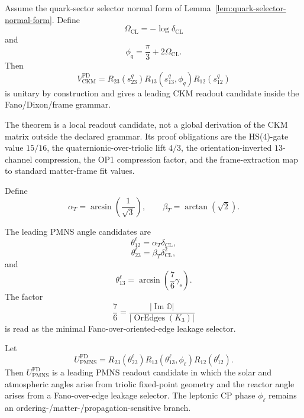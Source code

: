 \begin{theorem}
\label{thm:leading-ckm-fano-dixon-candidate}
Assume the quark-sector selector normal form of
Lemma~\ref{lem:quark-selector-normal-form}.  Define
\[
  \Omega_{\mathrm{CL}}=-\log\delta_{\mathrm{CL}}
\]
and
\[
  \phi_q
  =
  \frac{\pi}{3}+2\Omega_{\mathrm{CL}}.
\]
Then
\[
  V_{\mathrm{CKM}}^{\mathrm{FD}}
  =
  R_{23}(s_{23}^{q})
  R_{13}(s_{13}^{q},\phi_q)
  R_{12}(s_{12}^{q})
\]
is unitary by construction and gives a leading CKM readout candidate
inside the Fano/Dixon/frame grammar.
\end{theorem}

\begin{remark}
\label{rem:ckm-status-fd}
The theorem is a local readout candidate, not a global derivation of
the CKM matrix outside the declared grammar.  Its proof obligations are
the HS(4)-gate value \(15/16\), the quaternionic-over-triolic lift
\(4/3\), the orientation-inverted \(13\)-channel compression, the OP1
compression factor, and the frame-extraction map to standard matter-frame
fit values.
\end{remark}

\begin{definition}
\label{def:triolic-pmns-base-angles}
Define
\[
  \alpha_T=\arcsin\left(\frac1{\sqrt3}\right),
  \qquad
  \beta_T=\arctan(\sqrt2).
\]
\end{definition}

\begin{lemma}
\label{lem:pmns-triolic-fano-leakage}
The leading PMNS angle candidates are
\[
  \theta_{12}^{\ell}
  =
  \alpha_T\delta_{\mathrm{CL}},
\]
\[
  \theta_{23}^{\ell}
  =
  \beta_T\delta_{\mathrm{CL}}^2,
\]
and
\[
  \theta_{13}^{\ell}
  =
  \arcsin\left(\frac76\gamma_s\right).
\]
The factor
\[
  \frac76
  =
  \frac{|\operatorname{Im}\mathbb O|}
       {|\operatorname{OrEdges}(K_3)|}
\]
is read as the minimal Fano-over-oriented-edge leakage selector.
\end{lemma}

\begin{theorem}
\label{thm:leading-pmns-fd-candidate}
Let
\[
  U_{\mathrm{PMNS}}^{\mathrm{FD}}
  =
  R_{23}(\theta_{23}^{\ell})
  R_{13}(\theta_{13}^{\ell},\phi_{\ell})
  R_{12}(\theta_{12}^{\ell}).
\]
Then \(U_{\mathrm{PMNS}}^{\mathrm{FD}}\) is a leading PMNS readout
candidate in which the solar and atmospheric angles arise from
triolic fixed-point geometry and the reactor angle arises from a
Fano-over-edge leakage selector.  The leptonic CP phase
\(\phi_{\ell}\) remains an ordering-/matter-/propagation-sensitive branch.
\end{theorem}

